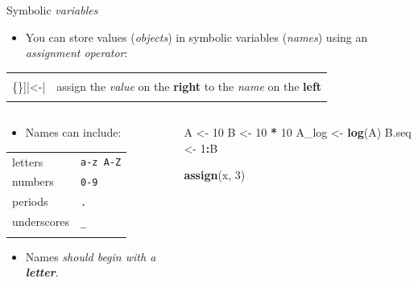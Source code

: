 \documentclass[
  ignorenonframetext,
]{beamer}
\newcommand{\VERB}{\Verb[commandchars=\\\{\}]}
\newenvironment{Shaded}{\begin{snugshade}}{\end{snugshade}}
\newcommand{\DecValTok}[1]{\textcolor[rgb]{0.00,0.00,0.81}{#1}}
\newcommand{\FunctionTok}[1]{\textcolor[rgb]{0.13,0.29,0.53}{\textbf{#1}}}
\newcommand{\NormalTok}[1]{#1}
\newcommand{\OtherTok}[1]{\textcolor[rgb]{0.56,0.35,0.01}{#1}}
\newcommand{\SpecialCharTok}[1]{\textcolor[rgb]{0.81,0.36,0.00}{\textbf{#1}}}
\newcommand{\StringTok}[1]{\textcolor[rgb]{0.31,0.60,0.02}{#1}}
\providecommand{\tightlist}{%
  \setlength{\itemsep}{0pt}\setlength{\parskip}{0pt}}
\begin{document}
\begin{frame}[fragile]{Symbolic \emph{variables}}
\protect\hypertarget{symbolic-variables}{}
\begin{itemize}
\tightlist
\item
  You can store values (\emph{objects}) in symbolic variables
  (\emph{names}) using an \emph{assignment operator}:
\end{itemize}

\begin{longtable}[]{@{}ll@{}}
\toprule\noalign{}
\endhead
\VERB|\OtherTok{\textless{}{-}}| & assign the \emph{value} on the
\textbf{right} to the \emph{name} on the \textbf{left} \\
\bottomrule\noalign{}
\end{longtable}

\begin{columns}[T]
\begin{column}{0.5\textwidth}
\begin{itemize}
\tightlist
\item
  Names can include:
\end{itemize}

\begin{longtable}[]{@{}ll@{}}
\toprule\noalign{}
\endhead
letters & \StringTok{\texttt{a-z A-Z}} \\
numbers & \StringTok{\texttt{0-9}} \\
periods & \StringTok{\texttt{.}} \\
underscores & \StringTok{\texttt{\_}} \\
\bottomrule\noalign{}
\end{longtable}

\begin{itemize}
\tightlist
\item
  Names \emph{should begin with a \textbf{\StringTok{letter}}}.
\end{itemize}
\end{column}

\begin{column}{0.5\textwidth}
\begin{Shaded}
\begin{Highlighting}[]
\NormalTok{A }\OtherTok{\textless{}{-}} \DecValTok{10}
\NormalTok{B }\OtherTok{\textless{}{-}} \DecValTok{10} \SpecialCharTok{*} \DecValTok{10}
\NormalTok{A\_log }\OtherTok{\textless{}{-}} \FunctionTok{log}\NormalTok{(A)}
\NormalTok{B.seq }\OtherTok{\textless{}{-}} \DecValTok{1}\SpecialCharTok{:}\NormalTok{B}

\FunctionTok{assign}\NormalTok{(}\StringTok{\textquotesingle{}x\textquotesingle{}}\NormalTok{, }\DecValTok{3}\NormalTok{)}
\end{Highlighting}
\end{Shaded}
\end{column}
\end{columns}
\end{frame}
\end{document}

